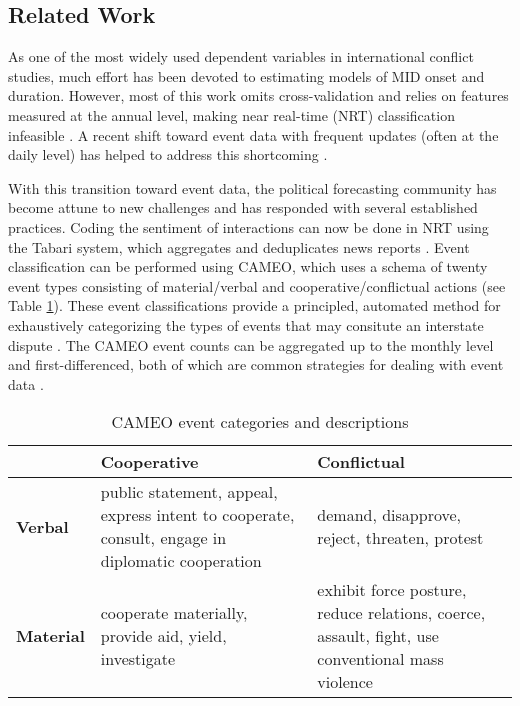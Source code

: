 \documentclass[12pt,letterpaper]{article} %
\begin{document}
\subsection{Related Work}


As one of the most widely used dependent variables in international conflict studies, much effort has been devoted to estimating models of MID onset and duration. However, most of this work omits cross-validation and relies on features measured at the annual level, making near real-time (NRT) classification infeasible \citep{ward2010perils}. A recent shift toward event data with frequent updates (often at the daily level) has helped to address this shortcoming \citep{gerner1994,gerner:etal:2002,king2003automated,ruggeri2011events,schrodt2013gdelt}. 

With this transition toward event data, the political forecasting community has become attune to new challenges and has responded with several established practices. Coding the sentiment of interactions can now be done in NRT using the Tabari system, which aggregates and deduplicates news reports \citep{o2010crisis,schrodt2009tabari}. Event classification can be performed using CAMEO, which uses a schema of twenty event types consisting of material/verbal and cooperative/conflictual actions (see Table \ref{cameo}). These event classifications provide a principled, automated method for exhaustively categorizing the types of events that may consitute an interstate dispute \citep{ghosn2004mid3}. The CAMEO event counts can be aggregated up to the monthly level and first-differenced, both of which are common strategies for dealing with event data \citep{arva2013improving, Box:1976,gerner:etal:2002,yonamine2013event}. 

\begin{table}[h!]
\caption{CAMEO event categories and descriptions}
\label{cameo}
\begin{center}
\begin{tabular}{lp{2in}p{2in}}
& \textbf{Cooperative} & \textbf{Conflictual} \\
\midrule
\textbf{Verbal} & public statement, appeal, express intent to cooperate, consult, engage in diplomatic cooperation & demand, disapprove, reject, threaten, protest \\
\textbf{Material} & cooperate materially, provide aid, yield, investigate & exhibit force posture, reduce relations, coerce, assault, fight, use conventional mass violence
\end{tabular}
\end{center}
\end{table}
\end{document}
